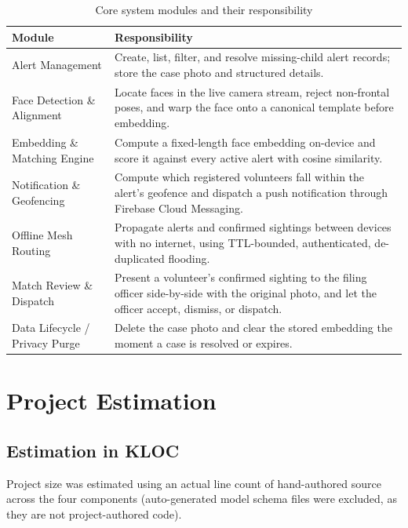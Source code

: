 \documentclass[12pt,a4paper,oneside]{report}
\begin{document}
\begin{table}[H]
\centering
\caption{Core system modules and their responsibility}
\begin{tabular}{|p{3.6cm}|p{10.0cm}|}
\hline
\textbf{Module} & \textbf{Responsibility} \\
\hline
Alert Management & Create, list, filter, and resolve missing-child alert records; store the case photo and structured details. \\ \hline
Face Detection \& Alignment & Locate faces in the live camera stream, reject non-frontal poses, and warp the face onto a canonical template before embedding. \\ \hline
Embedding \& Matching Engine & Compute a fixed-length face embedding on-device and score it against every active alert with cosine similarity. \\ \hline
Notification \& Geofencing & Compute which registered volunteers fall within the alert's geofence and dispatch a push notification through Firebase Cloud Messaging. \\ \hline
Offline Mesh Routing & Propagate alerts and confirmed sightings between devices with no internet, using TTL-bounded, authenticated, de-duplicated flooding. \\ \hline
Match Review \& Dispatch & Present a volunteer's confirmed sighting to the filing officer side-by-side with the original photo, and let the officer accept, dismiss, or dispatch. \\ \hline
Data Lifecycle / Privacy Purge & Delete the case photo and clear the stored embedding the moment a case is resolved or expires. \\
\hline
\end{tabular}
\end{table}

\section{Project Estimation}

\subsection{Estimation in KLOC}

Project size was estimated using an actual line count of hand-authored
source across the four components (auto-generated model schema files were
excluded, as they are not project-authored code).
\end{document}
